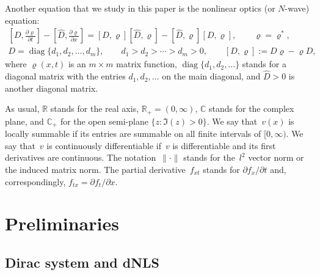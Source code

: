 \documentclass[11pt]{article}
\def\di{\operatorname{diag}}
\def\vr{\varrho}
\def\wh{\widehat}
\def\p{\partial}
\def\prt{\partial}
\def\BC{{\mathbb C}}
\def\BR{{\mathbb R}}
\numberwithin{equation}{section}
\begin{document}
\setcounter{section}{1}
\setcounter{subsection}{0}
\setcounter{subsubsection}{0}
\setcounter{Theorem}{0}
\setcounter{equation}{7}
Another equation that we study in this paper is the nonlinear optics (or $N$-wave) equation:
\begin{gather} \label{NW1}
\left[D, \frac{\prt \vr}{\prt t} \right] - \left[\wh D, \frac{\prt \vr}{\prt x} \right]
=
[D, \vr] [\wh D, \vr] - [\wh D, \vr] [ D, \vr], \qquad \vr=\vr^*, \\
\label{NW2} D=
\di \{ d_1,  d_2, \ldots,
 d_m \}, \qquad d_1>d_2>\cdots>d_m>0, \qquad [D,\vr]:=D\vr-\vr D,
\end{gather}
where $\vr(x,t)$ is an $m\times m$ matrix function, $\di \{ d_1, d_2, \ldots \}$ stands for a diagonal matrix with the
entries $d_1, d_2, \dots$ on the main diagonal, and $\wh D>0$ is another diagonal matrix.

\setcounter{section}{1}
\setcounter{subsection}{0}
\setcounter{subsubsection}{0}
\setcounter{Theorem}{0}
\setcounter{equation}{10}
As usual, $\BR$ stands for the real axis,
$\BR_+=(0, \infty)$,
$\BC$ stands for the complex plane, and
$\BC_+$ for the open semi-plane $\{z\colon \Im(z)>0\}$.
We say that~$v(x)$ is locally summable if its entries are summable on all f\/inite intervals of $[0, \infty)$.
We say that~$v$ is continuously dif\/ferentiable
if~$v$ is dif\/ferentiable and its f\/irst derivatives are continuous.
The notation~$\| \cdot \|$ stands for the~$l^2$ vector norm or the induced matrix norm.
The partial derivative~$f_{xt}$ stands for $\p f_x / \p t$ and, correspondingly, $f_{tx} = \p f_t / \p x$.

\setcounter{section}{1}
\setcounter{subsection}{0}
\setcounter{subsubsection}{0}
\setcounter{Theorem}{0}
\setcounter{equation}{10}
\section{Preliminaries} \label{Prel}

\subsection{Dirac system and dNLS}
\end{document}
